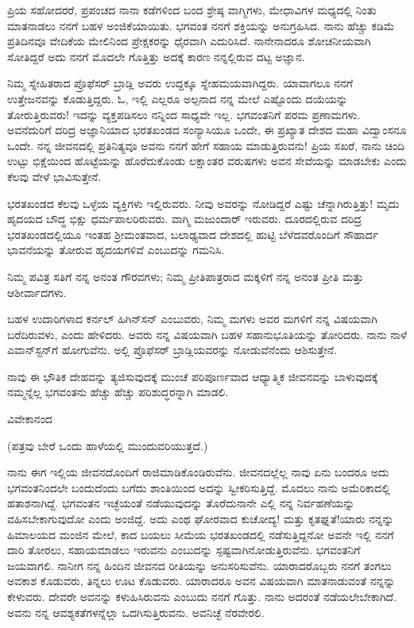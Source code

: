 ಪ್ರಿಯ ಸಹೋದರರೆ, ಪ್ರಪಂಚದ ನಾನಾ ಕಡೆಗಳಿಂದ ಬಂದ ಶ್ರೇಷ್ಠ ವಾಗ್ಮಿಗಳು, ಮೇಧಾವಿಗಳ ಮಧ್ಯದಲ್ಲಿ ನಿಂತು ಮಾತನಾಡಲು ನನಗೆ ಬಹಳ ಅಂಜಿಕೆಯಾಯಿತು. ಭಗವಂತ ನನಗೆ ಶಕ್ತಿಯನ್ನು ಅನುಗ್ರಹಿಸಿದ. ನಾನು ಹೆಚ್ಚು ಕಡಿಮೆ ಪ್ರತಿದಿನವೂ ವೇದಿಕೆಯ ಮೇಲಿನಿಂದ ಪ್ರೇಕ್ಷಕರನ್ನು ಧೈರವಾಗಿ ಎದುರಿಸಿದೆ. ನಾನೇನಾದರೂ ಶೋಚನೀಯವಾಗಿ ಸೋತಿದ್ದರೆ \enginline{-}ಅದು ನನಗೆ ಮೊದಲೇ ಗೊತ್ತಿತ್ತು\enginline{-} ಅದಕ್ಕೆ ಕಾರಣ ನನ್ನಲ್ಲಿರುವ ದಟ್ಟ ಅಜ್ಞಾನ.

ನಿಮ್ಮ ಸ್ನೇಹಿತರಾದ ಪ್ರೊಫೆಸರ್ ಬ್ರಾಡ್ಲಿ ಅವರು ಉದ್ದಕ್ಕೂ ಸ್ನೇಹಮಯವಾಗಿದ್ದರು. ಯಾವಾಗಲೂ ನನಗೆ ಉತ್ತೇಜನವನ್ನು ಕೊಡುತ್ತಿದ್ದರು. ಓ, ಇಲ್ಲಿ ಎಲ್ಲರೂ ಅಲ್ಪನಾದ ನನ್ನ ಮೇಲೆ ಎಷ್ಟೊಂದು ದಯೆಯನ್ನು ತೋರುತ್ತಿರುವರು! ಇದನ್ನು ವ್ಯಕ್ತಪಡಿಸಲು ನನ್ನಿಂದ ಸಾಧ್ಯವೇ ಇಲ್ಲ. ಭಗವಂತನಿಗೆ ಪರಮ ಪ್ರಣಾಮಗಳು. ಅವನೆದುರಿಗೆ ದರಿದ್ರ ಅಜ್ಞಾನಿಯಾದ ಭರತಖಂಡದ ಸಂನ್ಯಾಸಿಯೂ ಒಂದೇ, ಈ ಪ್ರಖ್ಯಾತ ದೇಶದ ಮಹಾ ವಿದ್ವಾಂಸನೂ ಒಂದೇ. ನನ್ನ ಜೀವನದಲ್ಲಿ ಪ್ರತಿನಿತ್ಯವೂ ಅವನು ನನಗೆ ಹೇಗೆ ಸಹಾಯ ಮಾಡುತ್ತಿರುವನು! ಪ್ರಿಯ ಸಖರೆ, ನಾನು ಚಿಂದಿ ಉಟ್ಟು ಭಿಕ್ಷೆಯಿಂದ ಹೊಟ್ಟೆಯನ್ನು ಹೊರೆದುಕೊಂಡು ಲಕ್ಷಾಂತರ ವರುಷಗಳು ಅವನ ಸೇವೆಯನ್ನು ಮಾಡಬೇಕು ಎಂದು ಕೆಲವು ವೇಳೆ ಭಾವಿಸುತ್ತೇನೆ.

ಭರತಖಂಡದ ಕೆಲವು ಒಳ್ಳೆಯ ವ್ಯಕ್ತಿಗಳು ಇಲ್ಲಿರುವರು. ನೀವು ಅವರನ್ನು ನೋಡಿದ್ದರೆ ಎಷ್ಟು ಚೆನ್ನಾಗಿರುತ್ತಿತ್ತು! ಮೃದು ಹೃದಯದ ಬೌದ್ಧ ಭಿಕ್ಷು ಧರ್ಮಪಾಲರಿರುವರು. ವಾಗ್ಮಿ ಮಜುಂದಾರ್ ಇರುವರು. ದೂರದಲ್ಲಿರುವ ದರಿದ್ರ ಭರತಖಂಡದಲ್ಲಿಯೂ ಇಂತಹ ಶ‍್ರೀಮಂತವಾದ, ಬಲಾಢ್ಯವಾದ ದೇಶದಲ್ಲಿ ಹುಟ್ಟಿ ಬೆಳೆದವರೊಂದಿಗೆ ಸೌಹಾರ್ದ ಭಾವನೆಯನ್ನು ತೋರುವ ಹೃದಯಗಳಿವೆ ಎಂಬುದನ್ನು ಗಮನಿಸಿ.

ನಿಮ್ಮ ಪವಿತ್ರ ಸತಿಗೆ ನನ್ನ ಅನಂತ ಗೌರವಗಳು; ನಿಮ್ಮ ಪ್ರೀತಿಪಾತ್ರರಾದ ಮಕ್ಕಳಿಗೆ ನನ್ನ ಅನಂತ ಪ್ರೀತಿ ಮತ್ತು ಆಶೀರ್ವಾದಗಳು.

ಬಹಳ ಉದಾರಿಗಳಾದ ಕರ್ನಲ್ ಹಿಗಿನ್‌ಸನ್ ಎಂಬುವರು, ನಿಮ್ಮ ಮಗಳು ಅವರ ಮಗಳಿಗೆ ನನ್ನ ವಿಷಯವಾಗಿ ಬರೆದಿರುವಳು, ಎಂದು ಹೇಳಿದರು. ಅವರು ನನ್ನ ವಿಷಯವಾಗಿ ಬಹಳ ಸಹಾನುಭೂತಿಯನ್ನು ತೋರಿದರು. ನಾನು ನಾಳೆ ಎವಾನ್‌ಸ್ಟನ್‌ಗೆ ಹೋಗುವೆನು. ಅಲ್ಲಿ ಪ್ರೊಫೆಸರ್‌ ಬ್ರಾಡ್ಲಿಯವರನ್ನು ನೋಡುವೆನೆಂದು ಆಶಿಸುತ್ತೇನೆ.

ನಾವು ಈ ಭೌತಿಕ ದೇಹವನ್ನು ತ್ಯಜಿಸುವುದಕ್ಕೆ ಮುಂಚೆ ಪರಿಪೂರ್ಣವಾದ ಆಧ್ಯಾತ್ಮಿಕ ಜೀವನವನ್ನು ಬಾಳುವುದಕ್ಕೆ ನಮ್ಮನ್ನೆಲ್ಲ ಭಗವಂತನು ಹೆಚ್ಚು ಹೆಚ್ಚು ಪರಿಶುದ್ಧರನ್ನಾಗಿ ಮಾಡಲಿ.

\begin{flushright}
ವಿವೇಕಾನಂದ
\end{flushright}

(ಪತ್ರವು ಬೇರೆ ಒಂದು ಹಾಳೆಯಲ್ಲಿ ಮುಂದುವರಿಯುತ್ತದೆ.)

ನಾನು ಈಗ ಇಲ್ಲಿಯ ಜೀವನದೊಂದಿಗೆ ರಾಜಿಮಾಡಿಕೊಂಡಿರುವೆನು. ಜೀವನದಲ್ಲೆಲ್ಲ ನಾವು ಏನು ಬಂದರೂ ಅದು ಭಗವಂತನಿಂದಲೇ ಬಂದುದೆಂದು ಬಗೆದು ಶಾಂತಿಯಿಂದ ಅದನ್ನು ಸ್ವೀಕರಿಸುತ್ತಿದ್ದೆ. ಮೊದಲು ನಾನು ಅಮೆರಿಕಾದಲ್ಲಿ ಹತಾಶನಾಗಿದ್ದೆ. ಭಗವಂತನ ಇಚ್ಛೆಯಂತೆ ನಡೆಯುವುದನ್ನು ತೊರೆದುನಾನೇ ಎಲ್ಲಿ ನನ್ನ ನಿರ್ವಹಣೆಯನ್ನು ವಹಿಸಬೇಕಾಗುವುದೋ ಎಂದು ಅಂಜಿದ್ದೆ. ಅದು ಎಂಥ ಘೋರವಾದ ಕುಚೋದ್ಯ! ಮತ್ತು ಕೃತಘ್ನತೆ!ಯಾರು ನನ್ನನ್ನು ಹಿಮಾಲಯದ ಮಂಜಿನ ಮೇಲೆ, ಕಾದ ಬಯಲು ಸೀಮೆಯ ಭರತಖಂಡದಲ್ಲಿ ನಡೆಸುತ್ತಿದ್ದನೋ ಅವನೇ ಇಲ್ಲಿ ನನಗೆ ದಾರಿ ತೋರಲು, ಸಹಾಯಮಾಡಲು ಇರುವನು ಎಂಬುದನ್ನು ಸ್ಪಷ್ಟವಾಗಿನೋಡುತ್ತಿರುವೆನು. ಭಗವಂತನಿಗೆ ಜಯವಾಗಲಿ. ನಾನೀಗ ನನ್ನ ಹಿಂದಿನ ಜೀವನದ ರೀತಿಯನ್ನು ಅನುಸರಿಸುವೆನು. ಯಾರಾದರೊಬ್ಬರು ನನಗೆ ತಂಗಲು ಅವಕಾಶ ಕೊಡುವರು, ತಿನ್ನಲು ಊಟ ಕೊಡುವರು. ಯಾರಾದರೂ ಅವನ ವಿಷಯವಾಗಿ ಮಾತನಾಡುವಂತೆ ನನ್ನನ್ನು ಕೇಳುವರು. ದೇವರೇ ಅವನನ್ನು ಕಳುಹಿಸಿರುವನು ಎಂಬುದು ನನಗೆ ಗೊತ್ತು. ನಾನು ಅದರಂತೆ ನಡೆಯಲೇಬೇಕಾಗಿದೆ. ಅವನು ನನ್ನ ಆವಶ್ಯಕತೆಗಳನ್ನೆಲ್ಲಾ ಒದಗಿಸುತ್ತಿರುವನು. ಅವನಿಚ್ಛೆ ನೆರವೇರಲಿ.

